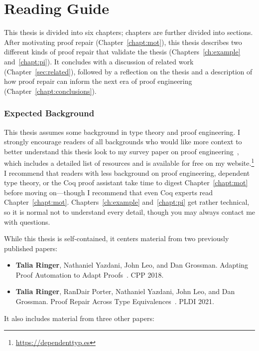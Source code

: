 \section{Reading Guide}


This thesis is divided into six chapters; chapters are further divided into sections.
After motivating proof repair (Chapter~\ref{chapt:mot}),
this thesis describes two different kinds of proof repair that validate the thesis (Chapters~\ref{ch:example} and~\ref{chapt:pi}).
It concludes with a discussion of related work (Chapter~\ref{sec:related}),
followed by a reflection on the thesis and a description of how proof repair can inform the next era of 
proof engineering (Chapter~\ref{chapt:conclusions}).

\subsubsection*{Expected Background}

This thesis assumes some background in type theory and proof engineering.
I strongly encourage readers of all backgrounds who would like more context to better understand this thesis
look to my survey paper on proof engineering~\cite{PGL-045}, which includes a detailed list of resources
and is available for free on my website.\footnote{\url{https://dependenttyp.es}}
I recommend that readers with less background on proof engineering, dependent type theory, or the Coq proof assistant
take time to digest Chapter~\ref{chapt:mot} before moving on---though I recommend that even Coq experts read Chapter~\ref{chapt:mot}.
Chapters~\ref{ch:example} and~\ref{chapt:pi} get rather technical, so it is normal not to understand every detail,
though you may always contact me with questions.

While this thesis is self-contained, it centers material from two previously published papers:

\begin{itemize}
\item \textbf{Talia Ringer}, Nathaniel Yazdani, John Leo, and Dan Grossman. Adapting Proof Automation to Adapt Proofs~\cite{ringer2018adapting}. CPP 2018.
\item \textbf{Talia Ringer}, RanDair Porter, Nathaniel Yazdani, John Leo, and Dan Grossman. Proof Repair Across Type Equivalences~\cite{Ringer2021}. PLDI 2021.
\end{itemize}
It also includes material from three other papers:

